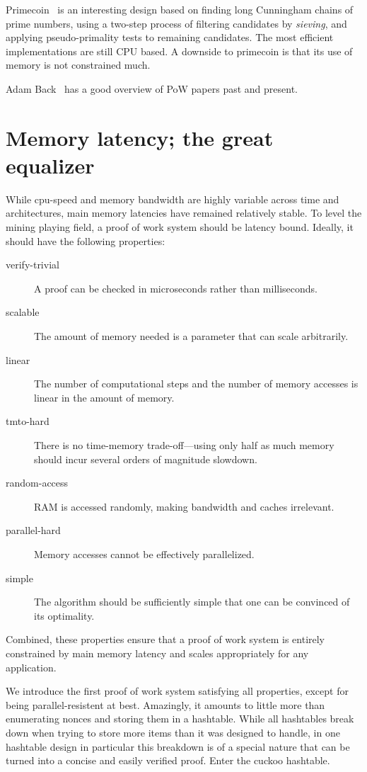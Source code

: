 \documentclass[11pt, oneside]{article}
\begin{document}
Primecoin~\cite{king2013} is an interesting design based on finding long Cunningham chains
of prime numbers, using a two-step process of filtering candidates by {\em sieving}, and applying
pseudo-primality tests to remaining candidates. The most efficient implementations are still CPU based.
A downside to primecoin is that its use of memory is not constrained much.

Adam Back~\cite{back2014} has a good overview of PoW papers past and present.

\section{Memory latency; the great equalizer}
While cpu-speed and memory bandwidth are highly variable across time and architectures,
main memory latencies have remained relatively stable.
To level the mining playing field, a proof of work system should be latency bound.
Ideally, it should have the following properties:
\begin{description}
\item[verify-trivial] A proof can be checked in microseconds rather than milliseconds.
\item[scalable] The amount of memory needed is a parameter that can scale arbitrarily.
\item[linear] The number of computational steps and the number of memory accesses is linear in the amount of memory.
\item[tmto-hard] There is no time-memory trade-off---using only half as much memory should
incur several orders of magnitude slowdown.
\item[random-access] RAM is accessed randomly, making bandwidth and caches irrelevant.
\item[parallel-hard] Memory accesses cannot be effectively parallelized.
\item[simple] The algorithm should be sufficiently simple that one can be convinced of its optimality.
\end{description}
Combined, these properties ensure that a proof of work system is entirely constrained by main
memory latency and scales appropriately for any application.

We introduce the first proof of work system satisfying all properties,
except for being parallel-resistent at best.
Amazingly, it amounts to little more than enumerating nonces and storing them
in a hashtable. While all hashtables break down when trying to store more items than
it was designed to handle, in one hashtable design in particular this breakdown
is of a special nature that can be turned into a concise and easily verified proof.
Enter the cuckoo hashtable.
\end{document}

